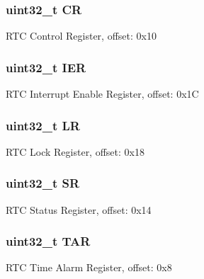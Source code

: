 \subsubsection[{C\+R}]{\setlength{\rightskip}{0pt plus 5cm}uint32\+\_\+t C\+R}\label{struct_r_t_c___mem_map_a1fc7b5e311820889eb21ee6a292c168e}
R\+T\+C Control Register, offset\+: 0x10 \hypertarget{struct_r_t_c___mem_map_ae1a888131095f231df40e9d29e2aff7b}{}
\subsubsection[{I\+E\+R}]{\setlength{\rightskip}{0pt plus 5cm}uint32\+\_\+t I\+E\+R}\label{struct_r_t_c___mem_map_ae1a888131095f231df40e9d29e2aff7b}
R\+T\+C Interrupt Enable Register, offset\+: 0x1\+C \hypertarget{struct_r_t_c___mem_map_a3314de2ca1fccad1fe0411e61b2d282d}{}
\subsubsection[{L\+R}]{\setlength{\rightskip}{0pt plus 5cm}uint32\+\_\+t L\+R}\label{struct_r_t_c___mem_map_a3314de2ca1fccad1fe0411e61b2d282d}
R\+T\+C Lock Register, offset\+: 0x18 \hypertarget{struct_r_t_c___mem_map_a081f4304e18753e5e8d0afd71ccca45e}{}
\subsubsection[{S\+R}]{\setlength{\rightskip}{0pt plus 5cm}uint32\+\_\+t S\+R}\label{struct_r_t_c___mem_map_a081f4304e18753e5e8d0afd71ccca45e}
R\+T\+C Status Register, offset\+: 0x14 \hypertarget{struct_r_t_c___mem_map_a17a2cd556a1ac35305398a9b615155bb}{}
\subsubsection[{T\+A\+R}]{\setlength{\rightskip}{0pt plus 5cm}uint32\+\_\+t T\+A\+R}\label{struct_r_t_c___mem_map_a17a2cd556a1ac35305398a9b615155bb}
R\+T\+C Time Alarm Register, offset\+: 0x8 \hypertarget{struct_r_t_c___mem_map_a9a53e49441f15ba5815fbffc87f2819f}{}
